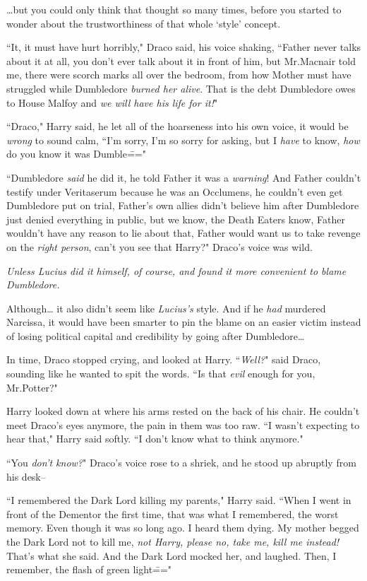 {\ldots}but you could only think that thought so many times, before you started to wonder about the trustworthiness of that whole `style' concept.

``It, it must have hurt horribly," Draco said, his voice shaking, ``Father never talks about it at all, you don't ever talk about it in front of him, but Mr.\?Macnair told me, there were scorch marks all over the bedroom, from how Mother must have struggled while Dumbledore \emph{burned her alive}. That is the debt Dumbledore owes to House Malfoy and \emph{we will have his life for it!}"

``Draco," Harry said, he let all of the hoarseness into his own voice, it would be \emph{wrong} to sound calm, ``I'm sorry, I'm so sorry for asking, but I \emph{have} to know, \emph{how} do you know it was Dumble\==="

``Dumbledore \emph{said} he did it, he told Father it was a \emph{warning}! And Father couldn't testify under Veritaserum because he was an Occlumens, he couldn't even get Dumbledore put on trial, Father's own allies didn't believe him after Dumbledore just denied everything in public, but we know, the Death Eaters know, Father wouldn't have any reason to lie about that, Father would want us to take revenge on the \emph{right person}, can't you see that Harry?" Draco's voice was wild.

\emph{Unless Lucius did it himself, of course, and found it more convenient to blame Dumbledore.}

Although{\ldots} it also didn't seem like \emph{Lucius's} style. And if he \emph{had} murdered Narcissa, it would have been smarter to pin the blame on an easier victim instead of losing political capital and credibility by going after Dumbledore{\ldots}

In time, Draco stopped crying, and looked at Harry. ``\emph{Well?}" said Draco, sounding like he wanted to spit the words. ``Is that \emph{evil} enough for you, Mr.\?Potter?"

Harry looked down at where his arms rested on the back of his chair. He couldn't meet Draco's eyes anymore, the pain in them was too raw. ``I wasn't expecting to hear that," Harry said softly. ``I don't know what to think anymore."

``You \emph{don't know?}" Draco's voice rose to a shriek, and he stood up abruptly from his desk\---

``I remembered the Dark Lord killing my parents," Harry said. ``When I went in front of the Dementor the first time, that was what I remembered, the worst memory. Even though it was so long ago. I heard them dying. My mother begged the Dark Lord not to kill me, \emph{not Harry, please no, take me, kill me instead!} That's what she said. And the Dark Lord mocked her, and laughed. Then, I remember, the flash of green light\==="


